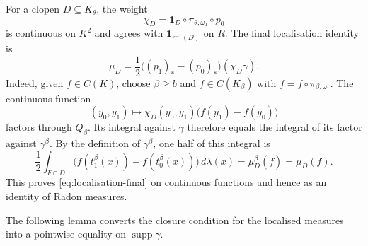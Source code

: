 \documentclass[a4paper,11pt]{amsart}
\theoremstyle{plain}
\theoremstyle{definition}
\theoremstyle{remark}
\newcommand{\supp}{\operatorname{supp}}
\newcommand{\one}{\mathbf 1}
\numberwithin{equation}{section}
\begin{document}
For a clopen $D\subseteq K_\theta$, the weight
\[
 \chi_D=\one_D\circ\pi_{\theta,\omega_1}\circ p_0
\]
is continuous on $K^2$ and agrees with $\one_{r^{-1}(D)}$ on $R$.  The final localisation identity is
\begin{equation}\label{eq:localisation-final}
 \mu_D=
 \frac12\bigl((p_1)_*-(p_0)_*\bigr)(\chi_D\gamma).
\end{equation}
Indeed, given $f\in C(K)$, choose $\beta\geqslant b$ and $\bar f\in C(K_\beta)$ with $f=\bar f\circ\pi_{\beta,\omega_1}$.  The continuous function
\[
 (y_0,y_1)\longmapsto
 \chi_D(y_0,y_1)\bigl(f(y_1)-f(y_0)\bigr)
\]
factors through $Q_\beta$.  Its integral against $\gamma$ therefore equals the integral of its factor against $\gamma^\beta$.  By the definition of $\gamma^\beta$, one half of this integral is
\[
 \frac12\int_{F\cap D}
  \bigl(\bar f(t_1^\beta(x))-\bar f(t_0^\beta(x))\bigr)
 \,d\lambda(x)
 =\mu_D^\beta(\bar f)=\mu_D(f).
\]
This proves \eqref{eq:localisation-final} on continuous functions and hence as an identity of Radon measures.

The following lemma converts the closure condition for the localised measures into a pointwise equality on $\supp\gamma$.
\end{document}
